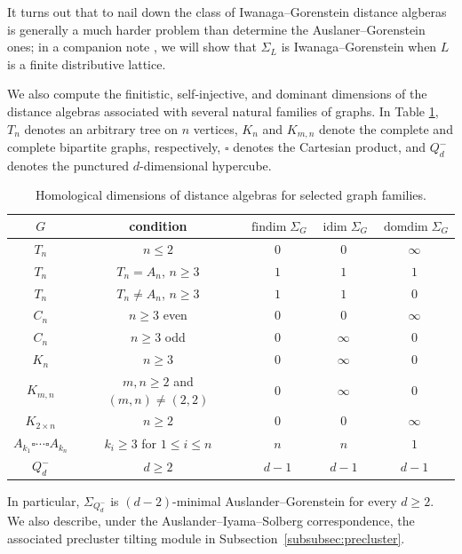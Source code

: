 \documentclass[a4paper,leqno]{amsart}
\begin{document}
It turns out that to nail down the class of Iwanaga--Gorenstein distance algberas is generally a much harder problem than determine the Auslaner--Gorenstein ones; in a companion note \cite{CX2026}, we will show that $\Sigma_L$ is Iwanaga--Gorenstein when $L$ is a finite distributive lattice.

\medskip 

We also compute the finitistic, self-injective, and dominant dimensions of the distance algebras associated with several natural families of graphs.  In Table \ref{tab:intro-homological-dimensions}, $T_n$ denotes an arbitrary tree on $n$ vertices, $K_n$ and $K_{m,n}$ denote the complete and complete bipartite graphs, respectively, $\square$ denotes the Cartesian product, and $Q_d^-$ denotes the punctured $d$-dimensional hypercube.

\begin{table}[htbp]
\centering
\caption{Homological dimensions of distance algebras for selected graph families.}
\label{tab:intro-homological-dimensions}
\small
\setlength{\tabcolsep}{4pt}
\renewcommand{\arraystretch}{1.15}
\begin{tabular}{c|c|c|c|c}
$G$ & condition & $\operatorname{findim}\Sigma_G$
& $\operatorname{idim}\Sigma_G$
& $\operatorname{domdim}\Sigma_G$ \\ \hline
$T_n$ & $n\leq2$ & $0$ & $0$ & $\infty$ \\
$T_n$ & $T_n=A_n$, $n\geq3$ & $1$ & $1$ & $1$ \\
$T_n$ & $T_n\neq A_n$, $n\geq3$ & $1$ & $1$ & $0$ \\ \hline
$C_n$ & $n\geq3$ even & $0$ & $0$ & $\infty$ \\
$C_n$ & $n\geq3$ odd & $0$ & $\infty$ & $0$ \\ \hline
$K_n$ & $n\geq3$ & $0$ & $\infty$ & $0$ \\ \hline
$K_{m,n}$ & $m,n\geq2$ and $(m,n)\neq(2,2)$
& $0$ & $\infty$ & $0$ \\ \hline
$K_{2\times n}$ & $n\geq2$
& $0$ & $0$ & $\infty$ \\ \hline
$A_{k_1}\square\cdots\square A_{k_n}$
& $k_i\geq3$ for $1\leq i\leq n$ & $n$ & $n$ & $1$ \\ \hline
$Q_d^-$ & $d\geq2$ & $d-1$ & $d-1$ & $d-1$
\end{tabular}
\end{table}

In particular, $\Sigma_{Q_d^-}$ is $(d-2)$-minimal Auslander--Gorenstein for every $d\geq2$.  We also describe, under the Auslander--Iyama--Solberg correspondence, the associated precluster tilting module in Subsection~\ref{subsubsec:precluster}.
\end{document}
